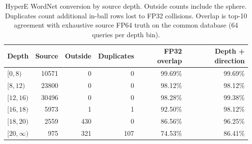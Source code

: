 \begin{table}[htbp]
  \centering
  \caption{HyperE WordNet conversion by source depth. Outside counts include the sphere. Duplicates count additional in-ball rows lost to FP32 collisions. Overlap is top-10 agreement with exhaustive source FP64 truth on the common database (64 queries per depth bin).}
  \label{tab:depth_precision}
  \footnotesize
  \setlength{\tabcolsep}{3pt}
  \begin{tabular}{@{}lrrrrr@{}}
  \toprule
  Depth & Source & Outside & Duplicates & FP32 overlap & Depth + direction \\
  \midrule
  $[0,8)$ & 10571 & 0 & 0 & 99.69\% & 99.69\% \\
  $[8,12)$ & 23800 & 0 & 0 & 98.12\% & 98.12\% \\
  $[12,16)$ & 30496 & 0 & 0 & 98.28\% & 99.38\% \\
  $[16,18)$ & 5973 & 1 & 1 & 92.50\% & 98.12\% \\
  $[18,20)$ & 2559 & 430 & 0 & 86.56\% & 96.25\% \\
  $[20,\infty)$ & 975 & 321 & 107 & 74.53\% & 86.41\% \\
  \bottomrule
  \end{tabular}
\end{table}
